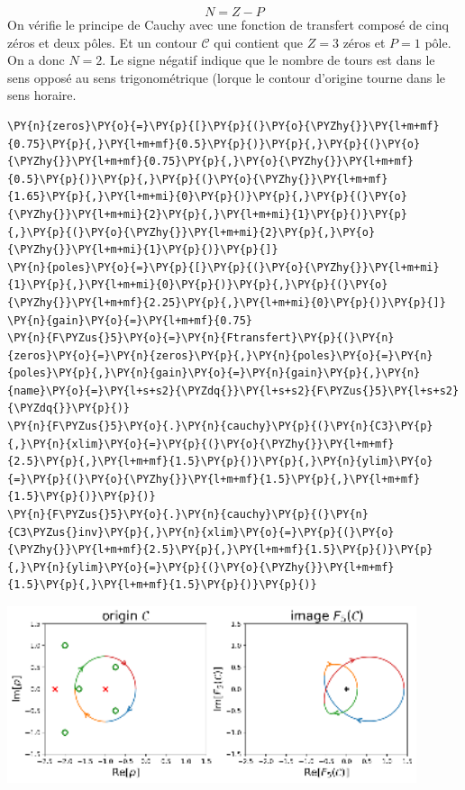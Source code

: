 \[
    N=Z-P
\]
On vérifie le principe de Cauchy avec une fonction de transfert composé
de cinq zéros et deux pôles. Et un contour \(\mathcal{C}\) qui contient 
que \(Z=3\) zéros et \(P=1\) pôle. On a donc \(N=2\). Le signe négatif
indique que le nombre de tours est dans le sens opposé au sens
trigonométrique (lorque le contour d'origine tourne dans le sens
horaire.
\begin{tcolorbox}[breakable, size=fbox, boxrule=1pt, pad at break*=1mm,colback=cellbackground, colframe=cellborder]
\begin{Verbatim}[commandchars=\\\{\}]
\PY{n}{zeros}\PY{o}{=}\PY{p}{[}\PY{p}{(}\PY{o}{\PYZhy{}}\PY{l+m+mf}{0.75}\PY{p}{,}\PY{l+m+mf}{0.5}\PY{p}{)}\PY{p}{,}\PY{p}{(}\PY{o}{\PYZhy{}}\PY{l+m+mf}{0.75}\PY{p}{,}\PY{o}{\PYZhy{}}\PY{l+m+mf}{0.5}\PY{p}{)}\PY{p}{,}\PY{p}{(}\PY{o}{\PYZhy{}}\PY{l+m+mf}{1.65}\PY{p}{,}\PY{l+m+mi}{0}\PY{p}{)}\PY{p}{,}\PY{p}{(}\PY{o}{\PYZhy{}}\PY{l+m+mi}{2}\PY{p}{,}\PY{l+m+mi}{1}\PY{p}{)}\PY{p}{,}\PY{p}{(}\PY{o}{\PYZhy{}}\PY{l+m+mi}{2}\PY{p}{,}\PY{o}{\PYZhy{}}\PY{l+m+mi}{1}\PY{p}{)}\PY{p}{]}
\PY{n}{poles}\PY{o}{=}\PY{p}{[}\PY{p}{(}\PY{o}{\PYZhy{}}\PY{l+m+mi}{1}\PY{p}{,}\PY{l+m+mi}{0}\PY{p}{)}\PY{p}{,}\PY{p}{(}\PY{o}{\PYZhy{}}\PY{l+m+mf}{2.25}\PY{p}{,}\PY{l+m+mi}{0}\PY{p}{)}\PY{p}{]}
\PY{n}{gain}\PY{o}{=}\PY{l+m+mf}{0.75}
\PY{n}{F\PYZus{}5}\PY{o}{=}\PY{n}{Ftransfert}\PY{p}{(}\PY{n}{zeros}\PY{o}{=}\PY{n}{zeros}\PY{p}{,}\PY{n}{poles}\PY{o}{=}\PY{n}{poles}\PY{p}{,}\PY{n}{gain}\PY{o}{=}\PY{n}{gain}\PY{p}{,}\PY{n}{name}\PY{o}{=}\PY{l+s+s2}{\PYZdq{}}\PY{l+s+s2}{F\PYZus{}5}\PY{l+s+s2}{\PYZdq{}}\PY{p}{)}
\PY{n}{F\PYZus{}5}\PY{o}{.}\PY{n}{cauchy}\PY{p}{(}\PY{n}{C3}\PY{p}{,}\PY{n}{xlim}\PY{o}{=}\PY{p}{(}\PY{o}{\PYZhy{}}\PY{l+m+mf}{2.5}\PY{p}{,}\PY{l+m+mf}{1.5}\PY{p}{)}\PY{p}{,}\PY{n}{ylim}\PY{o}{=}\PY{p}{(}\PY{o}{\PYZhy{}}\PY{l+m+mf}{1.5}\PY{p}{,}\PY{l+m+mf}{1.5}\PY{p}{)}\PY{p}{)}
\PY{n}{F\PYZus{}5}\PY{o}{.}\PY{n}{cauchy}\PY{p}{(}\PY{n}{C3\PYZus{}inv}\PY{p}{,}\PY{n}{xlim}\PY{o}{=}\PY{p}{(}\PY{o}{\PYZhy{}}\PY{l+m+mf}{2.5}\PY{p}{,}\PY{l+m+mf}{1.5}\PY{p}{)}\PY{p}{,}\PY{n}{ylim}\PY{o}{=}\PY{p}{(}\PY{o}{\PYZhy{}}\PY{l+m+mf}{1.5}\PY{p}{,}\PY{l+m+mf}{1.5}\PY{p}{)}\PY{p}{)}
\end{Verbatim}
\end{tcolorbox}
\begin{center}
    \includegraphics[width=0.9\textwidth]{notebook/fig/output_45_1.eps}
\end{center}
